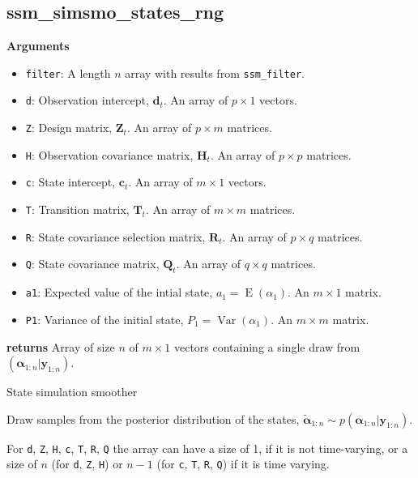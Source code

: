 \documentclass[]{book}
\providecommand{\tightlist}{%
  \setlength{\itemsep}{0pt}\setlength{\parskip}{0pt}}
\DeclareMathOperator{\E}{E}
\DeclareMathOperator{\Var}{Var}
\newcommand{\mat}[1]{\boldsymbol{#1}}
\renewcommand{\vec}[1]{\boldsymbol{#1}}
\begin{document}
\subsection{ssm\_simsmo\_states\_rng}\label{ssm_simsmo_states_rng}

\textbf{Arguments}

\begin{itemize}
\tightlist
\item
  \texttt{filter}: A length \(n\) array with results from
  \texttt{ssm\_filter}.
\item
  \texttt{d}: Observation intercept, \(\vec{d}_t\). An array of
  \(p \times 1\) vectors.
\item
  \texttt{Z}: Design matrix, \(\mat{Z}_t\). An array of \(p \times m\)
  matrices.
\item
  \texttt{H}: Observation covariance matrix, \(\mat{H}_t\). An array of
  \(p \times p\) matrices.
\item
  \texttt{c}: State intercept, \(\vec{c}_t\). An array of \(m \times 1\)
  vectors.
\item
  \texttt{T}: Transition matrix, \(\mat{T}_t\). An array of
  \(m \times m\) matrices.
\item
  \texttt{R}: State covariance selection matrix, \(\mat{R} _t\). An
  array of \(p \times q\) matrices.
\item
  \texttt{Q}: State covariance matrix, \(\mat{Q}_t\). An array of
  \(q \times q\) matrices.
\item
  \texttt{a1}: Expected value of the intial state,
  \(a_1 = \E(\alpha_1)\). An \(m \times 1\) matrix.
\item
  \texttt{P1}: Variance of the initial state, \(P_1 = \Var(\alpha_1)\).
  An \(m \times m\) matrix.
\end{itemize}

\textbf{returns} Array of size \(n\) of \(m \times 1\) vectors
containing a single draw from \((\vec{\alpha}_{1:n} | \vec{y}_{1:n})\).

State simulation smoother

Draw samples from the posterior distribution of the states,
\(\tilde{\vec{\alpha}}_{1:n} \sim p(\vec{\alpha}_{1:n} | \vec{y}_{1:n})\).

For \texttt{d}, \texttt{Z}, \texttt{H}, \texttt{c}, \texttt{T},
\texttt{R}, \texttt{Q} the array can have a size of 1, if it is not
time-varying, or a size of \(n\) (for \texttt{d}, \texttt{Z},
\texttt{H}) or \(n - 1\) (for \texttt{c}, \texttt{T}, \texttt{R},
\texttt{Q}) if it is time varying.
\end{document}

